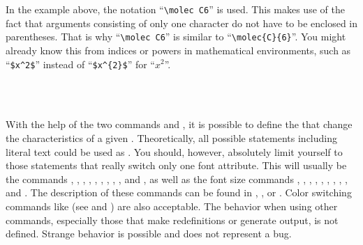 \iftrue
\begin{Explain}
  In the example above, the notation ``\verb|\molec C6|'' is used. This
  makes use of the fact that arguments consisting of only one
  character do not have to be enclosed in parentheses. That is why
  ``\verb|\molec C6|'' is similar to ``\verb|\molec{C}{6}|''. You
  might already know this from indices or powers in mathematical
  environments, such as ``\verb|$x^2$|'' instead of ``\verb|$x^{2}$|''
  for ``$x^2$''.
\end{Explain}
\else %
F\"ur Experten ist in \autoref{sec:experts.knowhow},
\autopageref{desc:experts.macroargs} dokumentiert, warum das Beispiel
funktioniert, obwohl teilweise die Argumente von \Macro{Molek} nicht in
geschweifte Klammern gesetzt wurden.%
\fi
\fi%
%
%
%
\fi%


\begin{Declaration}
  \\
  \\
\end{Declaration}%
%
%
%
With the help of the two commands  and
, it is possible to define the  that
change the characteristics of a given . Theoretically, all
possible statements including literal text could be used as .
You should, however, absolutely limit yourself to those
statements that really switch only one font attribute. This will usually be
the commands , , ,
, , , ,
, , and , as well as the font
size commands , , , ,
, , , ,
, and . The description of these commands can be
found in \cite{lshort}, \cite{latex:usrguide}, or \cite{latex:fntguide}. Color
switching commands like  (see \cite{package:graphics} and
\cite{package:xcolor}) are also acceptable.  The behavior when using other
commands, especially those that make redefinitions or generate output, is not
defined. Strange behavior is possible and does not represent a bug.

